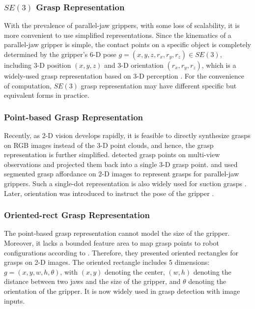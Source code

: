 \documentclass[letterpaper,10pt]{article}
\newcommand{\sethree}{SE(3)}
\begin{document}
\subsubsection{$\sethree$ Grasp Representation}
\label{sec:se3-grasp}

With the prevalence of parallel-jaw grippers, with some loss of scalability, it is more convenient to use simplified representations.
Since the kinematics of a parallel-jaw gripper is simple, the contact points on a specific object is completely determined by the gripper's 6-D pose $g=(x,y,z,r_x,r_y,r_z)\in\sethree$, including 3-D position $(x,y,z)$ and 3-D orientation $(r_x,r_y,r_z)$, which is a widely-used grasp representation based on 3-D perception \cite{miller2003automatic, gualtieri2016high, ten2017grasp, liang2019pointnetgpd}.
For the convenience of computation, $\sethree$ grasp representation may have different specific but equivalent forms in practice.

\subsubsection{Point-based Grasp Representation}
\label{sec:point-grasp}

Recently, as 2-D vision develops rapidly, it is feasible to directly synthesize grasps on RGB images instead of the 3-D point clouds, and hence, the grasp representation is further simplified. \cite{saxena2006robotic, saxena2008robotic} detected grasp points on multi-view observations and projected them back into a single 3-D grasp point. \cite{rao2010grasping} and \cite{asif2019densely} used segmented grasp affordance on 2-D images to represent grasps for parallel-jaw grippers. Such a single-dot representation is also widely used for suction grasps \cite{mahler2018dex, cao2021suctionnet, jiang2021learning}. Later, orientation was introduced to instruct the pose of the gripper \cite{mahler2017learning, wang2021double}.

\subsubsection{Oriented-rect Grasp Representation}
\label{sec:rect-grasp}

The point-based grasp representation cannot model the size of the gripper. Moreover, it lacks a bounded feature area to map grasp points to robot configurations according to \cite{jiang2011efficient}. Therefore, they presented oriented rectangles for grasps on 2-D images. The oriented rectangle includes 5 dimensions: $g=(x,y,w,h,\theta)$, with $(x,y)$ denoting the center, $(w,h)$ denoting the distance between two jaws and the size of the gripper, and $\theta$ denoting the orientation of the gripper. It is now widely used in grasp detection with image inputs.
\end{document}
